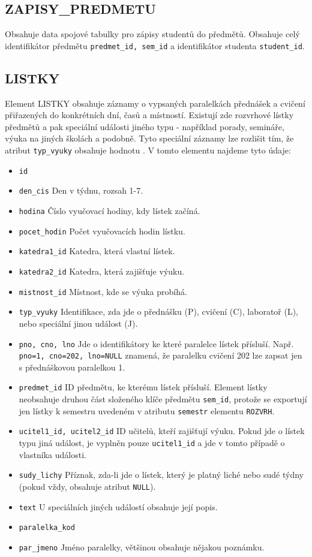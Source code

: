 \documentclass[11pt,twoside,a4paper]{book}
\begin{document}
\subsection{ZAPISY\_PREDMETU}
Obsahuje data spojové tabulky pro zápisy studentů do předmětů. Obsahuje celý identifikátor předmětu \texttt{predmet\_id, sem\_id} a identifikátor studenta \texttt{student\_id}.

\subsection{LISTKY}
Element LISTKY obsahuje záznamy o vypsaných paralelkách přednášek a cvičení přiřazených do konkrétních dní, časů a místností. Existují zde rozvrhové lístky předmětů a pak speciální události jiného typu - například porady, semináře, výuka na jiných školách a podobně. Tyto speciální záznamy lze rozlišit tím, že atribut \texttt{typ\_vyuky} obsahuje hodnotu . V tomto elementu najdeme tyto údaje:
\begin{itemize}
\item \texttt{id}
\item \texttt{den\_cis} Den v týdnu, rozsah 1-7.
\item \texttt{hodina} Číslo vyučovací hodiny, kdy lístek začíná.
\item \texttt{pocet\_hodin} Počet vyučovacích hodin lístku.
\item \texttt{katedra1\_id} Katedra, která vlastní lístek.
\item \texttt{katedra2\_id} Katedra, která zajišťuje výuku.
\item \texttt{mistnost\_id} Místnost, kde se výuka probíhá.
\item \texttt{typ\_vyuky} Identifikace, zda jde o přednášku (P), cvičení (C), laboratoř (L), nebo speciální jinou událost (J).
\item \texttt{pno, cno, lno} Jde o identifikátory ke které paralelce lístek přísluší. Např. \texttt{pno=1, cno=202, lno=NULL} znamená, že paralelku cvičení 202 lze zapsat jen s přednáškovou paralelkou 1.
\item \texttt{predmet\_id} ID předmětu, ke kterému lístek přísluší. Element lístky neobsahuje druhou část složeného klíče předmětu \texttt{sem\_id}, protože se exportují jen lístky k semestru uvedeném v atributu \texttt{semestr} elementu \texttt{ROZVRH}.
\item \texttt{ucitel1\_id, ucitel2\_id} ID učitelů, kteří zajišťují výuku. Pokud jde o lístek typu jiná událost, je vyplněn pouze \texttt{ucitel1\_id} a jde v tomto případě o vlastníka události.
\item \texttt{sudy\_lichy} Příznak, zda-li jde o lístek, který je platný liché nebo sudé týdny (pokud vždy, obsahuje atribut \texttt{NULL}).
\item \texttt{text} U speciálních jiných událostí obsahuje její popis.
\item \texttt{paralelka\_kod}
\item \texttt{par\_jmeno} Jméno paralelky, většinou obsahuje nějakou poznámku.

\end{itemize}
\end{document}
